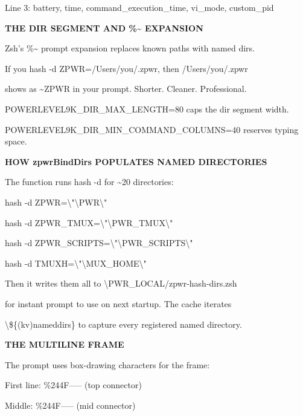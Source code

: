 \documentclass[11pt,a4paper,twoside]{book}
\begin{document}
Line 3: battery, time, command\_execution\_time, vi\_mode, custom\_pid


\vspace{12pt}
{\bfseries\color{neonyellow} THE DIR SEGMENT AND \%\textasciitilde{} EXPANSION}\vspace{4pt}

Zsh's \%\textasciitilde{} prompt expansion replaces known paths with named dirs.

\begin{codebox}
If you hash -d ZPWR=/Users/you/.zpwr, then /Users/you/.zpwr\\
\end{codebox}

shows as \textasciitilde{}ZPWR in your prompt. Shorter. Cleaner. Professional.

POWERLEVEL9K\_DIR\_MAX\_LENGTH=80 caps the dir segment width.

POWERLEVEL9K\_DIR\_MIN\_COMMAND\_COLUMNS=40 reserves typing space.


\vspace{12pt}
{\bfseries\color{neonyellow} HOW zpwrBindDirs POPULATES NAMED DIRECTORIES}\vspace{4pt}

The function runs hash -d for \textasciitilde{}20 directories:

hash -d ZPWR=\textbackslash{}"\textbackslash{}PWR\textbackslash{}"

hash -d ZPWR\_TMUX=\textbackslash{}"\textbackslash{}PWR\_TMUX\textbackslash{}"

hash -d ZPWR\_SCRIPTS=\textbackslash{}"\textbackslash{}PWR\_SCRIPTS\textbackslash{}"

hash -d TMUXH=\textbackslash{}"\textbackslash{}MUX\_HOME\textbackslash{}"

Then it writes them all to \textbackslash{}PWR\_LOCAL/zpwr-hash-dirs.zsh

for instant prompt to use on next startup. The cache iterates

\textbackslash{}\$\{(kv)nameddirs\} to capture every registered named directory.


\vspace{12pt}
{\bfseries\color{neonyellow} THE MULTILINE FRAME}\vspace{4pt}

The prompt uses box-drawing characters for the frame:

First line:  \%244F-----  (top connector)

Middle:      \%244F-----  (mid connector)
\end{document}
